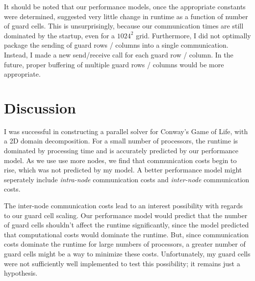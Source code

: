\documentclass[iop, apj]{emulateapj}
\begin{document}
It should be noted that our performance models, once the appropriate constants were determined, suggested very little change in runtime as a function of number of guard cells.  This is unsurprisingly, because our communication times are still dominated by the startup, even for a $1024^2$ grid.  Furthermore, I did not optimally package the sending of guard rows / columns into a single communication. Instead, I made a new send/receive call for each guard row / column.  In the future, proper buffering of multiple guard rows / columns would be more appropriate.

\section{Discussion}
I was successful in constructing a parallel solver for Conway's Game of Life, with a 2D domain decomposition.  For a small number of processors, the runtime is dominated by processing time and is accurately predicted by our performance model.  As we use use more nodes, we find that communication costs begin to rise, which was not predicted by my model.  A better performance model might seperately include \emph{intra-node} communication costs and \emph{inter-node} communication costs.

The inter-node communication costs lead to an interest possibility with regards to our guard cell scaling.  Our performance model would predict that the number of guard cells shouldn't affect the runtime significantly, since the model predicted that computational costs would dominate the runtime.  But, since communication costs dominate the runtime for large numbers of processors, a greater number of guard cells might be a way to minimize these costs.  Unfortunately, my guard cells were not sufficiently well implemented to test this possibility; it remains just a hypothesis.


\end{document}
